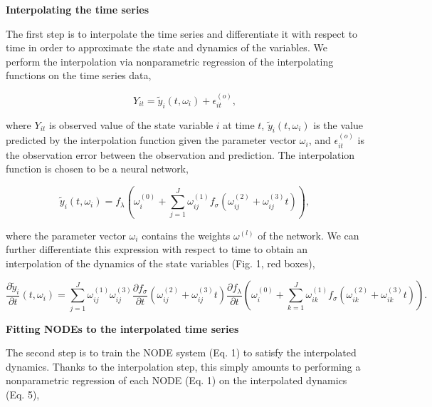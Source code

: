 \documentclass[11pt, oneside]{article}
\begin{document}
\textbf{Interpolating the time series}

The first step is to interpolate the time series and differentiate it with respect to time in order to approximate the state and dynamics of the variables.
We perform the interpolation via nonparametric regression of the interpolating functions on the time series data,

\vspace{-0.5cm}
\begin{equation}
    Y_{it} = \tilde{y}_i(t,\omega_i) + \epsilon^{(o)}_{it},
\end{equation}

where $Y_{it}$ is observed value of the state variable $i$ at time $t$, $\tilde{y}_i(t,\omega_i)$ is the value predicted by the interpolation function given the parameter vector $\omega_i$, and $\epsilon^{(o)}_{it}$ is the observation error between the observation and prediction. 
The interpolation function is chosen to be a neural network,

\vspace{-0.5cm}
\begin{equation}
    \tilde{y}_i (t,\omega_i) = f_\lambda \left( \omega_i^{(0)} + \sum_{j=1}^{J} \omega^{(1)}_{ij} f_\sigma \left( \omega^{(2)}_{ij} + \omega^{(3)}_{ij} t \right) \right),
\end{equation}

where the parameter vector $\omega_i$ contains the weights $\omega^{(l)}$ of the network.
We can further differentiate this expression with respect to time to obtain an interpolation of the dynamics of the state variables (Fig. 1, red boxes), 

\vspace{-0.5cm}
\begin{equation}
    \frac{\partial \tilde{y}_i}{\partial t} (t, \omega_i) = \sum_{j=1}^{J} \omega^{(1)}_{ij} \omega^{(3)}_{ij} \frac{\partial f_\sigma}{\partial t} \left(\omega^{(2)}_{ij} + \omega^{(3)}_{ij} t \right) \frac{\partial f_\lambda}{\partial t} \left ( \omega^{(0)}_{i} + \sum_{k=1}^{J} \omega^{(1)}_{ik} f_\sigma \left( \omega^{(2)}_{ik} + \omega^{(3)}_{ik} t \right) \right ). 
\end{equation}

\textbf{Fitting NODEs to the interpolated time series}

The second step is to train the NODE system (Eq. 1) to satisfy the interpolated dynamics.
Thanks to the interpolation step, this simply amounts to performing a nonparametric regression of each NODE (Eq. 1) on the interpolated dynamics (Eq. 5),
\end{document}
